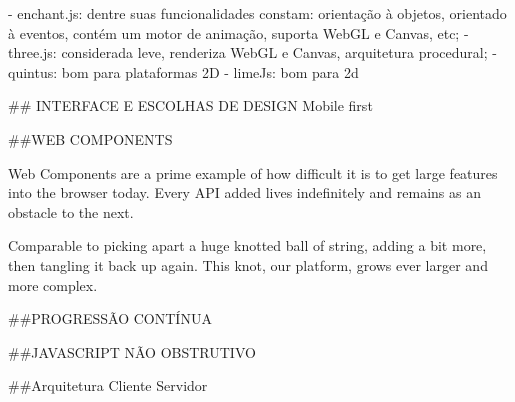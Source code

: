 \documentclass[11pt,a4paper]{article}
\begin{document}
- enchant.js: dentre suas funcionalidades constam: orientação à objetos, orientado à eventos, contém um motor de animação, suporta WebGL e Canvas, etc;
- three.js: considerada leve, renderiza WebGL e Canvas, arquitetura procedural;
- quintus: bom para plataformas 2D
- limeJs: bom para 2d

## INTERFACE E ESCOLHAS DE DESIGN
Mobile first


##WEB COMPONENTS

Web Components are a prime example of how difficult it is to get large features into the browser today. Every API added lives indefinitely and remains as an obstacle to the next.

Comparable to picking apart a huge knotted ball of string, adding a bit more, then tangling it back up again. This knot, our platform, grows ever larger and more complex.

##PROGRESSÃO CONTÍNUA

##JAVASCRIPT NÃO OBSTRUTIVO

##Arquitetura Cliente Servidor
\end{document}
